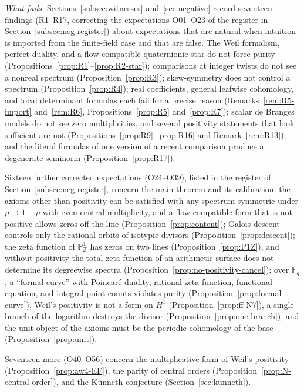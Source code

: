 \documentclass[11pt]{amsart}
\theoremstyle{plain}
\theoremstyle{definition}
\theoremstyle{remark}
\numberwithin{equation}{section}
\newcommand{\Z}{\mathbb{Z}}
\newcommand{\F}{\mathbb{F}}
\begin{document}
\emph{What fails.} Sections~\ref{subsec:witnesses}
and~\ref{sec:negative} record seventeen
findings (R1--R17, correcting the expectations O01--O23 of the register
in Section~\ref{subsec:neg-register})
about expectations that are natural when intuition is imported from the
finite-field case and that are false. The Weil formalism, perfect
duality, and a flow-compatible quaternionic star do not force purity
(Propositions~\ref{prop:R1}--\ref{prop:R2-star}); comparisons at integer
twists do not see a nonreal spectrum (Proposition~\ref{prop:R3});
skew-symmetry does not control a spectrum (Proposition~\ref{prop:R4});
real coefficients, general leafwise cohomology, and local determinant
formulas each fail for a precise reason
(Remarks~\ref{rem:R5-import} and~\ref{rem:R6},
Propositions~\ref{prop:R5} and~\ref{prop:R7}); scalar de Branges models
do not see zero multiplicities, and several positivity statements that
look sufficient are not (Propositions~\ref{prop:R9}--\ref{prop:R16} and
Remark~\ref{rem:R13}); and the literal formulas of
one version of a recent comparison produce a degenerate seminorm
(Proposition~\ref{prop:R17}).

Sixteen further corrected expectations
 (O24--O39),
listed in the register of Section~\ref{subsec:neg-register}, concern the
main theorem and its calibration: the axioms other than positivity can
be satisfied with any spectrum symmetric under $\rho\mapsto1-\rho$ with
even central multiplicity, and a flow-compatible form
that is not positive allows zeros off the line
(Proposition~\ref{prop:content}); Galois descent controls only the
rational orbits of isotypic divisors (Proposition~\ref{prop:descent});
the zeta function of $\mathbb{P}^1_\Z$ has zeros on two lines
(Proposition~\ref{prop:P1Z}), and without positivity the total zeta
function of an arithmetic surface does not determine its degreewise
spectra (Proposition~\ref{prop:no-positivity-cancel}); over $\F_q$, a
``formal curve'' with Poincar\'e duality, rational zeta function,
functional equation, and integral point counts violates purity
(Proposition~\ref{prop:formal-curve}), Weil's positivity is not a form
on $H^1$ (Proposition~\ref{prop:ff-N7}), a single branch of the
logarithm destroys the divisor (Proposition~\ref{prop:one-branch}), and
the unit object of the axioms must be the periodic cohomology of the
base (Proposition~\ref{prop:unit}).

Seventeen more
 (O40--O56) concern
the multiplicative form of Weil's positivity
(Proposition~\ref{prop:aw4-EF}), the parity of central orders
(Proposition~\ref{prop:N-central-order}), and the K\"unneth conjecture
(Section~\ref{sec:kunneth}).
\end{document}
